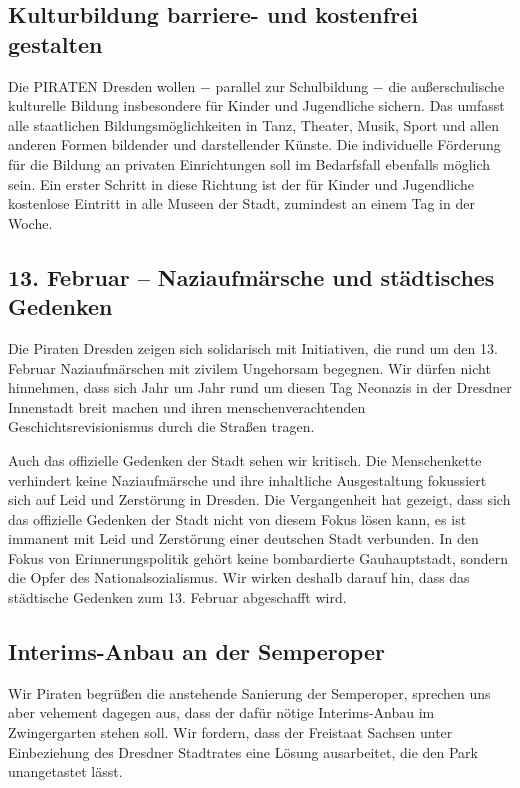 \documentclass[a4paper, 11pt]{article}
\begin{document}
\subsection{Kulturbildung barriere- und kostenfrei gestalten}
Die PIRATEN Dresden wollen $-$ parallel zur Schulbildung $-$ die außerschulische kulturelle Bildung insbesondere für Kinder und Jugendliche sichern. Das umfasst alle staatlichen Bildungsmöglichkeiten in Tanz, Theater, Musik, Sport und allen anderen Formen bildender und darstellender Künste. Die individuelle Förderung für die Bildung an privaten Einrichtungen soll im Bedarfsfall ebenfalls möglich sein. Ein erster Schritt in diese Richtung ist der für Kinder und Jugendliche kostenlose Eintritt in alle Museen der Stadt, zumindest an einem Tag in der Woche.

\subsection{13. Februar – Naziaufmärsche und städtisches Gedenken}
Die Piraten Dresden zeigen sich solidarisch mit Initiativen, die rund um den 13. Februar Naziaufmärschen mit zivilem Ungehorsam begegnen. Wir dürfen nicht hinnehmen, dass sich Jahr um Jahr rund um diesen Tag Neonazis in der Dresdner Innenstadt breit machen und ihren menschenverachtenden Geschichtsrevisionismus durch die Straßen tragen.\newline

Auch das offizielle Gedenken der Stadt sehen wir kritisch. Die Menschenkette verhindert keine Naziaufmärsche und ihre inhaltliche Ausgestaltung fokussiert sich auf Leid und Zerstörung in Dresden. Die Vergangenheit hat gezeigt, dass sich das offizielle Gedenken der Stadt nicht von diesem Fokus lösen kann, es ist immanent mit Leid und Zerstörung einer deutschen Stadt verbunden. In den Fokus von Erinnerungspolitik gehört keine bombardierte Gauhauptstadt, sondern die Opfer des Nationalsozialismus. Wir wirken deshalb darauf hin, dass das städtische Gedenken zum 13. Februar abgeschafft wird.

\subsection{Interims-Anbau an der Semperoper}
Wir Piraten begrüßen die anstehende Sanierung der Semperoper, sprechen uns aber vehement dagegen aus, dass der dafür nötige Interims-Anbau im Zwingergarten stehen soll. Wir fordern, dass der Freistaat Sachsen unter Einbeziehung des Dresdner Stadtrates eine Lösung ausarbeitet, die den Park unangetastet lässt.
\end{document}
